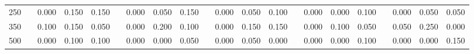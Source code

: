 % 
\begin{tabular}{ccccccccccccccccccccc}
  \hline
  \hline
250 &  & 0.000 & 0.150 & 0.150 &  & 0.000 & 0.050 & 0.150 &  & 0.000 & 0.050 & 0.100 &  & 0.000 & 0.000 & 0.100 &  & 0.000 & 0.050 & 0.050 \\ 
  350 &  & 0.100 & 0.150 & 0.050 &  & 0.000 & 0.200 & 0.100 &  & 0.000 & 0.150 & 0.150 &  & 0.000 & 0.100 & 0.050 &  & 0.050 & 0.250 & 0.000 \\ 
  500 &  & 0.000 & 0.100 & 0.100 &  & 0.000 & 0.000 & 0.050 &  & 0.000 & 0.050 & 0.000 &  & 0.000 & 0.000 & 0.100 &  & 0.000 & 0.000 & 0.150 \\ 
   \hline
\end{tabular}
